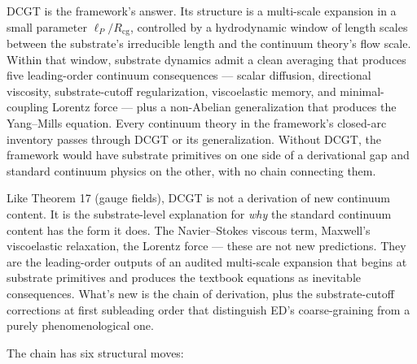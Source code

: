 \documentclass[11pt,a4paper]{article}
\begin{document}
DCGT is the framework's answer. Its structure is a multi-scale expansion in a small parameter $\ell_P/R_{\mathrm{cg}}$, controlled by a hydrodynamic window of length scales between the substrate's irreducible length and the continuum theory's flow scale. Within that window, substrate dynamics admit a clean averaging that produces five leading-order continuum consequences --- scalar diffusion, directional viscosity, substrate-cutoff regularization, viscoelastic memory, and minimal-coupling Lorentz force --- plus a non-Abelian generalization that produces the Yang--Mills equation. Every continuum theory in the framework's closed-arc inventory passes through DCGT or its generalization. Without DCGT, the framework would have substrate primitives on one side of a derivational gap and standard continuum physics on the other, with no chain connecting them.

Like Theorem 17 (gauge fields), DCGT is not a derivation of new continuum content. It is the substrate-level explanation for \emph{why} the standard continuum content has the form it does. The Navier--Stokes viscous term, Maxwell's viscoelastic relaxation, the Lorentz force --- these are not new predictions. They are the leading-order outputs of an audited multi-scale expansion that begins at substrate primitives and produces the textbook equations as inevitable consequences. What's new is the chain of derivation, plus the substrate-cutoff corrections at first subleading order that distinguish ED's coarse-graining from a purely phenomenological one.

The chain has six structural moves:
\end{document}
